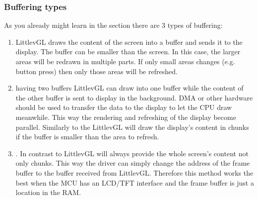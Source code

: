 \documentclass[letterpaper,10pt,english]{sphinxmanual}
\begin{document}
\subsubsection{Buffering types}
\label{\detokenize{overview/drawing:buffering-types}}
As you already might learn in the {\hyperref[\detokenize{porting/display::doc}]{}} section there are 3 types of buffering:
\begin{enumerate}
\def\theenumi{\arabic{enumi}}
\def\labelenumi{\theenumi .}
\makeatletter\def\p@enumii{\p@enumi \theenumi .}\makeatother
\item {} 
 LittlevGL draws the content of the screen into a buffer and sends it to the display. The buffer can be smaller than the screen. In this case, the larger areas will be redrawn in multiple parts. If only small areas changes (e.g. button press) then only those areas will be refreshed.

\item {} 
 having two buffers LittlevGL can draw into one buffer while the content of the other buffer is sent to display in the background.
DMA or other hardware should be used to transfer the data to the display to let the CPU draw meanwhile.
This way the rendering and refreshing of the display become parallel. Similarly to the  LittlevGL will draw the display’s content in chunks if the buffer is smaller than the area to refresh.

\item {} 
.
In contrast to  LittlevGL will always provide the whole screen’s content not only chunks. This way the driver can simply change the address of the frame buffer to the buffer received from LittlevGL.
Therefore this method works the best when the MCU has an LCD/TFT interface and the frame buffer is just a location in the RAM.

\end{enumerate}
\end{document}
